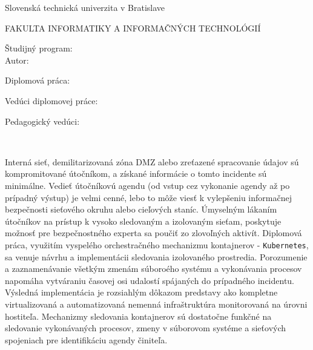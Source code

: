 \begin{minipage}[t]{1\columnwidth}%
Slovenská technická univerzita v Bratislave

FAKULTA INFORMATIKY A INFORMAČNÝCH TECHNOLÓGIÍ

Študijný program: \mojStudProgram\\

Autor: \mojeMeno

Diplomová práca: \mojNazov

Vedúci diplomovej práce: \mojVeduci

Pedagogický vedúci: \mojPedagogVeduci

\mojDatum\\
\end{minipage}


Interná sieť, demilitarizovaná zóna DMZ alebo zreťazené spracovanie údajov sú kompromitované útočníkom, a získané informácie o tomto incidente sú minimálne. Vedieť útočníkovú agendu (od vstup cez vykonanie agendy až po prípadný výstup) je velmi cenné, lebo to môže viesť k vylepšeniu informačnej bezpečnosti sieťového okruhu alebo cieľových staníc. Úmyselným lákaním útočníkov na prístup k vysoko sledovaným a izolovaným sieťam, poskytuje možnosť pre bezpečnostného experta sa poučiť zo zlovoľných aktivít. Diplomová práca, využitím vyspelého orchestračného mechanizmu kontajnerov - \texttt{Kubernetes}, sa venuje návrhu a implementácii sledovania izolovaného prostredia. Porozumenie a zaznamenávanie všetkým zmenám súboroého systému a vykonávania procesov napomáha vytváraniu časovej osi udalostí spájaných do prípadného incidentu. Výsledná implementácia je rozsiahlým dôkazom predstavy ako kompletne virtualizovaná a automatizovaná nemenná infraštruktúra monitorovaná na úrovni hostiteľa. Mechanizmy sledovania kontajnerov sú dostatočne funkčné na sledovanie vykonávaných procesov, zmeny v súborovom systéme a sieťových spojeniach pre identifikáciu agendy činiteľa.


\newpage{}\thispagestyle{empty}\medskip{}


\newpage{}

\newpage
\thispagestyle{empty}
\mbox{}
\newpage

